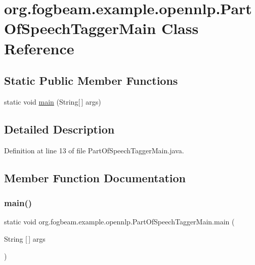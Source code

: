 \hypertarget{classorg_1_1fogbeam_1_1example_1_1opennlp_1_1_part_of_speech_tagger_main}{}\section{org.\+fogbeam.\+example.\+opennlp.\+Part\+Of\+Speech\+Tagger\+Main Class Reference}
\label{classorg_1_1fogbeam_1_1example_1_1opennlp_1_1_part_of_speech_tagger_main}
\subsection*{Static Public Member Functions}
\begin{DoxyCompactItemize}
\item 
static void \hyperlink{classorg_1_1fogbeam_1_1example_1_1opennlp_1_1_part_of_speech_tagger_main_a4fba6a0a946c1b17b9102b88894e69b3}{main} (String\mbox{[}$\,$\mbox{]} args)
\end{DoxyCompactItemize}


\subsection{Detailed Description}


Definition at line 13 of file Part\+Of\+Speech\+Tagger\+Main.\+java.



\subsection{Member Function Documentation}
\hypertarget{classorg_1_1fogbeam_1_1example_1_1opennlp_1_1_part_of_speech_tagger_main_a4fba6a0a946c1b17b9102b88894e69b3}{}\label{classorg_1_1fogbeam_1_1example_1_1opennlp_1_1_part_of_speech_tagger_main_a4fba6a0a946c1b17b9102b88894e69b3} 
\subsubsection{\texorpdfstring{main()}{main()}}
{\footnotesize\ttfamily static void org.\+fogbeam.\+example.\+opennlp.\+Part\+Of\+Speech\+Tagger\+Main.\+main (\begin{DoxyParamCaption}\item[{String \mbox{[}$\,$\mbox{]}}]{args }\end{DoxyParamCaption})\hspace{0.3cm}{\ttfamily [static]}}



